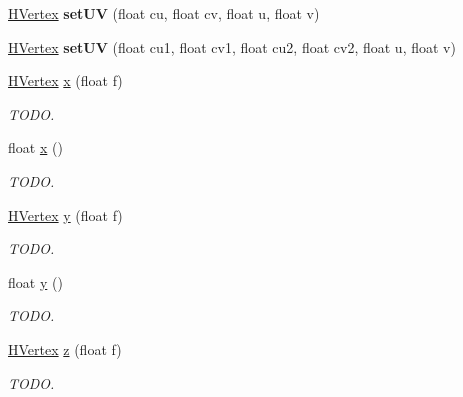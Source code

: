 \begin{DoxyCompactItemize}
\item 
\hypertarget{classhype_1_1extended_1_1util_1_1_h_vertex_a927dc5a531c22b42c84237105c636543}{\hyperlink{classhype_1_1extended_1_1util_1_1_h_vertex}{H\-Vertex} {\bfseries set\-U\-V} (float cu, float cv, float u, float v)}\label{classhype_1_1extended_1_1util_1_1_h_vertex_a927dc5a531c22b42c84237105c636543}

\item 
\hypertarget{classhype_1_1extended_1_1util_1_1_h_vertex_a3563d5e485dba1771e1c98bfa8954556}{\hyperlink{classhype_1_1extended_1_1util_1_1_h_vertex}{H\-Vertex} {\bfseries set\-U\-V} (float cu1, float cv1, float cu2, float cv2, float u, float v)}\label{classhype_1_1extended_1_1util_1_1_h_vertex_a3563d5e485dba1771e1c98bfa8954556}

\item 
\hyperlink{classhype_1_1extended_1_1util_1_1_h_vertex}{H\-Vertex} \hyperlink{classhype_1_1extended_1_1util_1_1_h_vertex_a90ac305d91672a6bb3c39e0cbab842cb}{x} (float f)
\begin{DoxyCompactList}\small\item\em T\-O\-D\-O. \end{DoxyCompactList}\item 
float \hyperlink{classhype_1_1extended_1_1util_1_1_h_vertex_a05be3d84fbca6243ea05196cdf9cfcc6}{x} ()
\begin{DoxyCompactList}\small\item\em T\-O\-D\-O. \end{DoxyCompactList}\item 
\hyperlink{classhype_1_1extended_1_1util_1_1_h_vertex}{H\-Vertex} \hyperlink{classhype_1_1extended_1_1util_1_1_h_vertex_a893b9dccd2aba73959ac2c14a3344ce8}{y} (float f)
\begin{DoxyCompactList}\small\item\em T\-O\-D\-O. \end{DoxyCompactList}\item 
float \hyperlink{classhype_1_1extended_1_1util_1_1_h_vertex_a77d742ddbde23fa5fc4942734636cd0c}{y} ()
\begin{DoxyCompactList}\small\item\em T\-O\-D\-O. \end{DoxyCompactList}\item 
\hyperlink{classhype_1_1extended_1_1util_1_1_h_vertex}{H\-Vertex} \hyperlink{classhype_1_1extended_1_1util_1_1_h_vertex_af5bbed3961cc694dc08c81e0ba6d2ba1}{z} (float f)
\begin{DoxyCompactList}\small\item\em T\-O\-D\-O. \end{DoxyCompactList}\item 

\end{DoxyCompactItemize}
